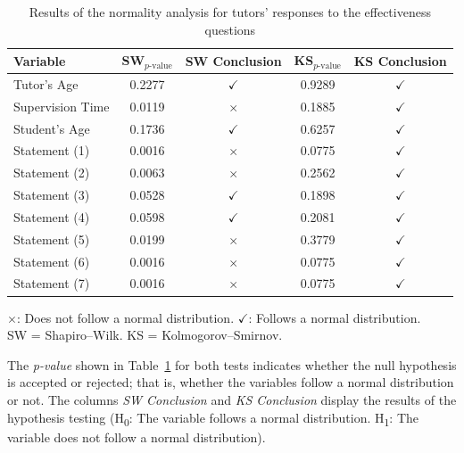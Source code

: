                 \begin{table}[h]
                    \centering
                    \caption{Results of the normality analysis for tutors' responses to the effectiveness questions}
                    \begin{tabularx}{0.85\textwidth}{Xcccc}
                        \hline
                        \textbf{Variable} & \textbf{SW$_{p\text{-value}}$} & \textbf{SW Conclusion} & \textbf{KS$_{p\text{-value}}$} & \textbf{KS Conclusion} \\
                        \hline
                        Tutor's Age & 0.2277 & \(\checkmark\) & 0.9289 & \(\checkmark\) \\
                        Supervision Time & 0.0119 & \(\times\) & 0.1885 & \(\checkmark\) \\
                        Student's Age & 0.1736 & \(\checkmark\) & 0.6257 & \(\checkmark\) \\
                        Statement (1) & 0.0016 & \(\times\) & 0.0775 & \(\checkmark\) \\
                        Statement (2) & 0.0063 & \(\times\) & 0.2562 & \(\checkmark\) \\
                        Statement (3) & 0.0528 & \(\checkmark\) & 0.1898 & \(\checkmark\) \\
                        Statement (4) & 0.0598 & \(\checkmark\) & 0.2081 & \(\checkmark\) \\
                        Statement (5) & 0.0199 & \(\times\) & 0.3779 & \(\checkmark\) \\
                        Statement (6) & 0.0016 & \(\times\) & 0.0775 & \(\checkmark\) \\
                        Statement (7) & 0.0016 & \(\times\) & 0.0775 & \(\checkmark\) \\
                        \hline
                    \end{tabularx}
                    \label{tab:NormalityTest}
                    \vspace{0.3em} %
                    \parbox{0.75\textwidth}{\footnotesize
                        \(\times\): Does not follow a normal distribution. \(\checkmark\): Follows a normal distribution.\\
                        SW = Shapiro–Wilk. KS = Kolmogorov–Smirnov.
                    }
                \end{table}
                
                The \textit{p-value} shown in Table~\ref{tab:NormalityTest} for both tests indicates whether the null hypothesis is accepted or rejected; that is, whether the variables follow a normal distribution or not. The columns \textit{SW Conclusion} and \textit{KS Conclusion} display the results of the hypothesis testing (H\textsubscript{0}: The variable follows a normal distribution. H\textsubscript{1}: The variable does not follow a normal distribution).
                

